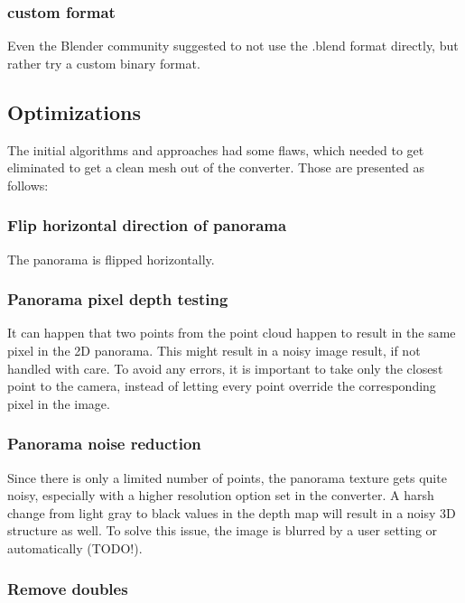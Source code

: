 \subsubsection{custom format}

Even the Blender community suggested to not use the .blend format directly, but rather try a custom binary format. \parencite[compare]{webBlenderArtistsBlendExport}


\subsection{Optimizations}

The initial algorithms and approaches had some flaws, which needed to get eliminated to get a clean mesh out of the converter. Those are presented as follows:

\subsubsection{Flip horizontal direction of panorama}

The panorama is flipped horizontally.

\subsubsection{Panorama pixel depth testing}

It can happen that two points from the point cloud happen to result in the same pixel in the 2D panorama. This might result in a noisy image result, if not handled with care. To avoid any errors, it is important to take only the closest point to the camera, instead of letting every point override the corresponding pixel in the image.

\subsubsection{Panorama noise reduction}

Since there is only a limited number of points, the panorama texture gets quite noisy, especially with a higher resolution option set in the converter. A harsh change from light gray to black values in the depth map will result in a noisy 3D structure as well.
To solve this issue, the image is blurred by a user setting or automatically (TODO!).

\subsubsection{Remove doubles}

